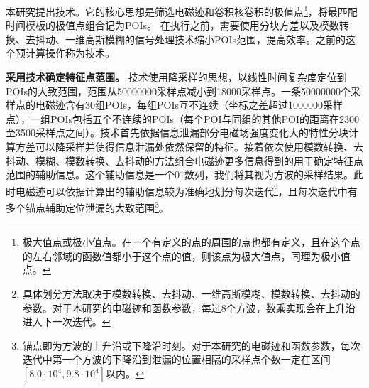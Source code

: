 {{	本研究提出\yuchuli 技术。它的核心思想是筛选电磁迹和卷积核卷积的极值点\footnote{极大值点或极小值点。在一个有定义的点的周围的点也都有定义，且在这个点的左右邻域的函数值都小于这个点的值，则该点为极大值点，同理为极小值点。}，将最匹配时间模板的极值点组合记为POIs。
%	
	在执行\yuchuli 之前，需要使用分块方差以及模数转换、去抖动、一维高斯模糊的信号处理技术缩小POIs范围，提高\yuchuli 效率。\yuchuli 之前的这个预计算操作称为\poifanwei 技术。
	
	

	\textbf{采用\poifanwei 技术确定特征点范围。}	
	\poifanwei 技术使用降采样的思想，以线性时间复杂度定位到POIs的大致范围，范围从50000000采样点减小到18000采样点。一条50000000个采样点的电磁迹含有30组POIs，每组POIs互不连续（坐标之差超过1000000采样点），一组POIs包括五个不连续的POIs（每个POI与同组的其他POI的距离在2300至3500采样点之间）。\poifanwei 技术首先依据信息泄漏部分电磁场强度变化大的特性分块计算方差可以降采样并使得信息泄漏处依然保留的特征。接着依次使用模数转换、去抖动、模糊、模数转换、去抖动的方法组合电磁迹更多信息得到的用于确定特征点范围的辅助信息。这个辅助信息是一个01数列，我们将其视为方波的采样结果。此时电磁迹可以依据计算出的辅助信息较为准确地划分每次迭代\footnote{具体划分方法取决于模数转换、去抖动、一维高斯模糊、模数转换、去抖动的参数。对于本研究的电磁迹和函数参数，每过8个方波，数乘实现会在上升沿进入下一次迭代。}，且每次迭代中有多个锚点辅助定位泄漏的大致范围\footnote{锚点即为方波的上升沿或下降沿时刻。对于本研究的电磁迹和函数参数，每次迭代中第一个方波的下降沿到泄漏的位置相隔的采样点个数一定在区间$[8.0\cdot10^{4},9.8\cdot10^{4}]$以内。}。
	
}}
